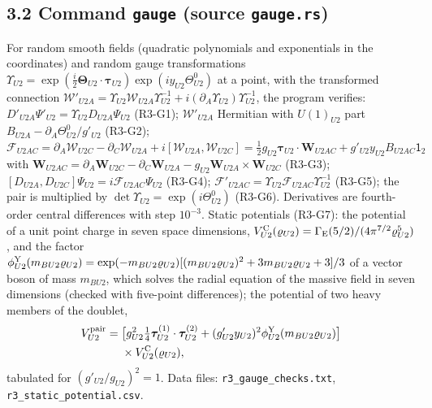 \documentclass[
  10pt,
]{article}
\begin{document}
\hypertarget{command-gauge-source-gauge.rs}{%
\subsection{\texorpdfstring{3.2 Command \texttt{gauge} (source
\texttt{gauge.rs})}{3.2 Command gauge (source gauge.rs)}}\label{command-gauge-source-gauge.rs}}

For random smooth fields (quadratic polynomials and exponentials in the
coordinates) and random gauge transformations
\(\Upsilon_{U2}=\exp(\tfrac i2\boldsymbol\Theta_{U2}\cdot\boldsymbol\tau_{U2})\exp(iy_{U2}\Theta^0_{U2})\)
at a point, with the transformed connection
\(\mathcal W'_{U2A}=\Upsilon_{U2}\mathcal W_{U2A}\Upsilon^{-1}_{U2}+i(\partial_A\Upsilon_{U2})\Upsilon^{-1}_{U2}\),
the program verifies:
\(D'_{U2A}\Psi'_{U2}=\Upsilon_{U2}D_{U2A}\Psi_{U2}\) (R3-G1);
\(\mathcal W'_{U2A}\) Hermitian with \(U(1)_{U2}\) part
\(B_{U2A}-\partial_A\Theta^0_{U2}/g'_{U2}\) (R3-G2);
\(\mathcal F_{U2AC}=\partial_A\mathcal W_{U2C}-\partial_C\mathcal W_{U2A}+i[\mathcal W_{U2A},\mathcal W_{U2C}] =\tfrac12g_{U2}\boldsymbol\tau_{U2}\cdot\boldsymbol W_{U2AC}+g'_{U2}y_{U2}B_{U2AC}\mathsf 1_2\)
with
\(\boldsymbol W_{U2AC}=\partial_A\boldsymbol W_{U2C}-\partial_C\boldsymbol W_{U2A}-g_{U2}\boldsymbol W_{U2A}\times\boldsymbol W_{U2C}\)
(R3-G3); \([D_{U2A},D_{U2C}]\Psi_{U2}=i\mathcal F_{U2AC}\Psi_{U2}\)
(R3-G4);
\(\mathcal F'_{U2AC}=\Upsilon_{U2}\mathcal F_{U2AC}\Upsilon^{-1}_{U2}\)
(R3-G5); the pair is multiplied by
\(\det\Upsilon_{U2}=\exp(i\Theta^0_{U2})\) (R3-G6). Derivatives are
fourth-order central differences with step \(10^{-3}\). Static
potentials (R3-G7): the potential of a unit point charge in seven space
dimensions,
\(V^{\rm C}_{U2}(\varrho_{U2})=\Gamma_{\rm E}(5/2)/(4\pi^{7/2}\varrho^5_{U2})\),
and the factor
\(\phi^{\rm Y}_{U2}(m_{BU2}\varrho_{U2})=\exp(-m_{BU2}\varrho_{U2})[(m_{BU2}\varrho_{U2})^2+3m_{BU2}\varrho_{U2}+3]/3\)
of a vector boson of mass \(m_{BU2}\), which solves the radial equation
of the massive field in seven dimensions (checked with five-point
differences); the potential of two heavy members of the doublet,
\[\begin{aligned}V^{\rm pair}_{U2}={}&\big[g^2_{U2}\tfrac14\boldsymbol\tau^{(1)}_{U2}\cdot\boldsymbol\tau^{(2)}_{U2}+(g'_{U2}y_{U2})^2\phi^{\rm Y}_{U2}(m_{BU2}\varrho_{U2})\big]\\&\times V^{\rm C}_{U2}(\varrho_{U2}),\end{aligned}\]
tabulated for \((g'_{U2}/g_{U2})^2=1\). Data files:
\texttt{r3\_gauge\_checks.txt}, \texttt{r3\_static\_potential.csv}.
\end{document}
